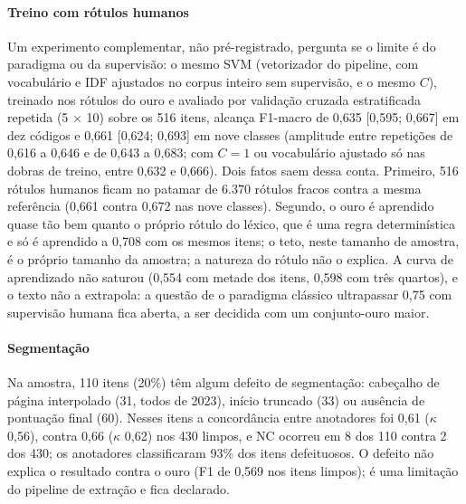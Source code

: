 \documentclass[fleqn,10pt]{SelfArx}
\begin{document}
\paragraph{Treino com rótulos humanos} Um experimento complementar, não pré-registrado, pergunta se o limite é do paradigma ou da supervisão: o mesmo SVM (vetorizador do pipeline, com vocabulário e IDF ajustados no corpus inteiro sem supervisão, e o mesmo $C$), treinado nos rótulos do ouro e avaliado por validação cruzada estratificada repetida (5 $\times$ 10) sobre os 516 itens, alcança F1-macro de 0,635 [0,595; 0,667] em dez códigos e 0,661 [0,624; 0,693] em nove classes (amplitude entre repetições de 0,616 a 0,646 e de 0,643 a 0,683; com $C = 1$ ou vocabulário ajustado só nas dobras de treino, entre 0,632 e 0,666). Dois fatos saem dessa conta. Primeiro, 516 rótulos humanos ficam no patamar de 6.370 rótulos fracos contra a mesma referência (0,661 contra 0,672 nas nove classes). Segundo, o ouro é aprendido quase tão bem quanto o próprio rótulo do léxico, que é uma regra determinística e só é aprendido a 0,708 com os mesmos itens; o teto, neste tamanho de amostra, é o próprio tamanho da amostra; a natureza do rótulo não o explica. A curva de aprendizado não saturou (0,554 com metade dos itens, 0,598 com três quartos), e o texto não a extrapola: a questão de o paradigma clássico ultrapassar 0,75 com supervisão humana fica aberta, a ser decidida com um conjunto-ouro maior.

\paragraph{Segmentação} Na amostra, 110 itens (20\%) têm algum defeito de segmentação: cabeçalho de página interpolado (31, todos de 2023), início truncado (33) ou ausência de pontuação final (60). Nesses itens a concordância entre anotadores foi 0,61 ($\kappa$ 0,56), contra 0,66 ($\kappa$ 0,62) nos 430 limpos, e NC ocorreu em 8 dos 110 contra 2 dos 430; os anotadores classificaram 93\% dos itens defeituosos. O defeito não explica o resultado contra o ouro (F1 de 0,569 nos itens limpos); é uma limitação do pipeline de extração e fica declarado.
\end{document}
